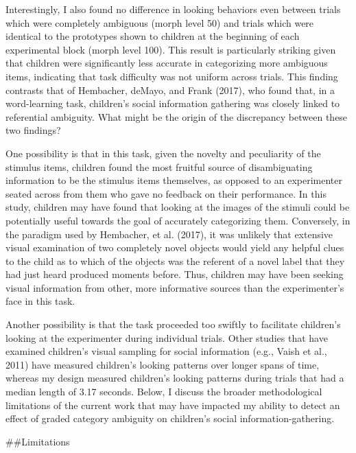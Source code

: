 \documentclass[,man,floatsintext]{apa6}
\begin{document}
Interestingly, I also found no difference in looking behaviors even between trials which were completely ambiguous (morph level 50) and trials which were identical to the prototypes shown to children at the beginning of each experimental block (morph level 100). This result is particularly striking given that children were significantly less accurate in categorizing more ambiguous items, indicating that task difficulty was not uniform across trials. This finding contrasts that of Hembacher, deMayo, and Frank (2017), who found that, in a word-learning task, children's social information gathering was closely linked to referential ambiguity. What might be the origin of the discrepancy between these two findings?

One possibility is that in this task, given the novelty and peculiarity of the stimulus items, children found the most fruitful source of disambiguating information to be the stimulus items themselves, as opposed to an experimenter seated across from them who gave no feedback on their performance. In this study, children may have found that looking at the images of the stimuli could be potentially useful towards the goal of accurately categorizing them. Conversely, in the paradigm used by Hembacher, et al. (2017), it was unlikely that extensive visual examination of two completely novel objects would yield any helpful clues to the child as to which of the objects was the referent of a novel label that they had just heard produced moments before. Thus, children may have been seeking visual information from other, more informative sources than the experimenter's face in this task.

Another possibility is that the task proceeded too swiftly to facilitate children's looking at the experimenter during individual trials. Other studies that have examined children's visual sampling for social information (e.g., Vaish et al., 2011) have measured children's looking patterns over longer spans of time, whereas my design measured children's looking patterns during trials that had a median length of 3.17 seconds. Below, I discuss the broader methodological limitations of the current work that may have impacted my ability to detect an effect of graded category ambiguity on children's social information-gathering.

\#\#Limitations
\end{document}
